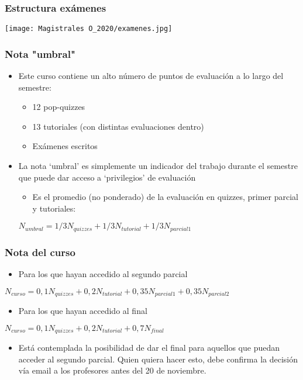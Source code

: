 \documentclass[14pt]{beamer}
\begin{document}
\begin{frame}
\frametitle{Estructura exámenes}
\centering
\texttt{[image: Magistrales O\_2020/examenes.jpg]}
\end{frame}

\begin{frame}
\frametitle{Nota "umbral"}
\begin{itemize}
    \item Este curso contiene un alto número de puntos de evaluación a lo largo del semestre:
        \begin{itemize}
            \item 12 pop-quizzes
            \item 13 tutoriales (con distintas evaluaciones dentro)
            \item Exámenes escritos
        \end{itemize}
    \item La nota ‘umbral’ es simplemente un indicador del trabajo durante el semestre que puede dar acceso a ‘privilegios’ de evaluación
        \begin{itemize}
            \item Es el promedio (no ponderado) de la evaluación en quizzes, primer parcial y tutoriales:  
        \end{itemize}
        $N_{umbral}=1/3N_{quizzes}+1/3N_{tutorial}+1/3N_{parcial 1}$
\end{itemize}
\end{frame}

\begin{frame}
\frametitle{Nota del curso}
\begin{itemize}
    \item Para los que hayan accedido al segundo parcial 
\end{itemize}
\small{$N_{curso}=0,1N_{quizzes}+0,2N_{tutorial}+0,35N_{parcial 1}+0,35N_{parcial 2}$}
\vspace{2mm}
\begin{itemize}
    \item Para los que hayan accedido al final
\end{itemize}
\small{$N_{curso}=0,1N_{quizzes}+0,2N_{tutorial}+0,7N_{final}$}
\vspace{2mm}
\begin{itemize}
    \item Está contemplada la posibilidad de dar el final para aquellos que puedan acceder al segundo parcial. Quien quiera hacer esto, debe confirma la decisión vía email a los profesores antes del 20 de noviembre.
\end{itemize}
\end{frame}
\end{document}
